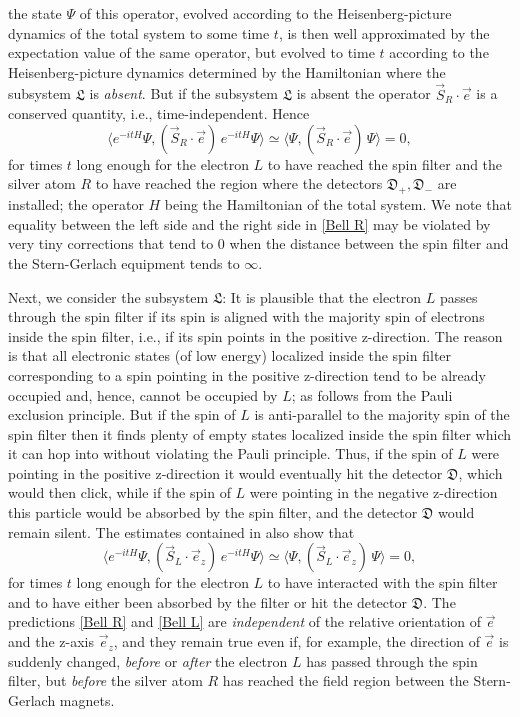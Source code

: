 \documentclass[12pt]{article}
\begin{document}
the state $\Psi$ of this operator, evolved according to the Heisenberg-picture dynamics of the total system to some
time $t$, is then well approximated by the expectation value of the same operator, but evolved to time $t$ according to the
Heisenberg-picture dynamics determined by the Hamiltonian where the subsystem $\mathfrak{L}$ is \textit{absent}.
But if the subsystem $\mathfrak{L}$ is absent the operator $\vec{S}_{R}\cdot \vec{e}$ is a conserved quantity, i.e.,
time-independent. Hence
\begin{equation}\label{Bell R}
\langle e^{-itH} \Psi, (\vec{S}_{R}\cdot \vec{e})\, e^{-itH} \Psi \rangle \simeq \langle \Psi, (\vec{S}_{R}\cdot \vec{e})\,
\Psi \rangle = 0,
\end{equation}
for times $t$ long enough for the electron $L$ to have reached the spin filter and the silver atom $R$ to have reached
the region where the detectors $\mathfrak{D}_{+}, \mathfrak{D}_{-}$ are installed; the operator $H$ being the
Hamiltonian of the total system. We note that equality between the left side and the right side in \eqref{Bell R}
may be violated by very tiny corrections that tend to 0 when the distance between the spin filter and the
Stern-Gerlach equipment tends to $\infty$.

Next, we consider the subsystem $\mathfrak{L}$: It is plausible that the electron $L$ passes through the spin filter
 if its spin is aligned with the majority spin of electrons inside the spin filter, i.e., if its spin points in the positive z-direction.
 The reason is that all electronic states (of low energy) localized inside the spin filter corresponding to a spin pointing in
 the positive z-direction tend to be already occupied and, hence, cannot be occupied by $L$; as follows from the Pauli
 exclusion principle. But if the spin of $L$ is anti-parallel to the majority spin of the spin filter then it finds plenty of empty
 states localized inside the spin filter which it can hop into without violating the Pauli principle.
Thus, if the spin of $L$ were pointing in the positive z-direction it would eventually hit the detector $\mathfrak{D}$, which
would then click, while if the spin of $L$ were pointing in the negative z-direction this particle would be absorbed by
the spin filter, and the detector $\mathfrak{D}$ would remain silent.
The estimates contained in \cite{FFS} also show that
\begin{equation}\label{Bell L}
\langle e^{-itH} \Psi, (\vec{S}_{L}\cdot \vec{e}_z)\, e^{-itH} \Psi \rangle \simeq \langle \Psi, (\vec{S}_{L}\cdot \vec{e}_z)\,
\Psi \rangle = 0,
\end{equation}
for times $t$ long enough for the electron $L$ to have interacted with the spin filter and to have either been absorbed
by the filter or hit the detector $\mathfrak{D}$. The predictions \eqref{Bell R} and \eqref{Bell L} are \textit{independent}
of the relative orientation of $\vec{e}$  and the z-axis $\vec{e}_z$, and they remain true even if, for example, the direction of
$\vec{e}$ is suddenly changed, \textit{before} or \textit{after} the electron $L$ has passed through the spin filter, but
\textit{before} the silver atom $R$ has reached the field region between the Stern-Gerlach magnets.
\end{document}
